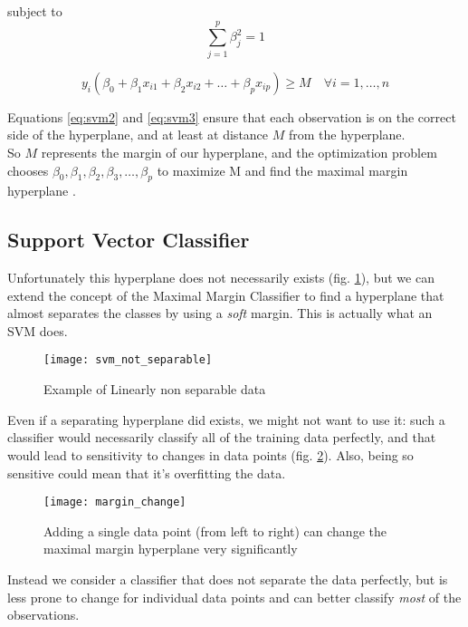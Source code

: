 subject to
\begin{equation} \label{eq:svm2}
	\sum_{j=1}^{p}\beta^2_j = 1
\end{equation}

\begin{equation} \label{eq:svm3}
	y_i(\beta_0 + \beta_1 x_{i1} + \beta_2 x_{i2} + \dots + \beta_p x_{ip}) \ge M \quad \forall i = 1, \dots, n
\end{equation}

Equations \ref{eq:svm2} and \ref{eq:svm3} ensure that each observation is on the correct side of the hyperplane, and at least at distance $M$ from the hyperplane. \\
So $M$ represents the margin of our hyperplane, and the optimization problem chooses $\beta_0, \beta_1, \beta_2, \beta_3, \dots, \beta_p$ to maximize M and find the maximal margin hyperplane \cite{ISLR}.

\subsection{Support Vector Classifier}
Unfortunately this hyperplane does not necessarily exists (fig. \ref{fig:svmnotsep}), but we can extend the concept of the Maximal Margin Classifier to find a hyperplane that almost separates the classes by using a \textit{soft} margin. This is actually what an SVM does.

\begin{figure}[H]
	\centering
	\texttt{[image: svm\_not\_separable]}
	\caption{Example of Linearly non separable data \cite{svm_not_sep}}
	\label{fig:svmnotsep}
\end{figure}

Even if a separating hyperplane did exists, we might not want to use it: such a classifier would necessarily  classify all of the training data perfectly, and that would lead to sensitivity to changes in data points (fig. \ref{fig:margin_change}). Also, being so sensitive could mean that it's overfitting the data. 

\begin{figure}[H]
	\centering
	\texttt{[image: margin\_change]}
	\caption{Adding a single data point (from left to right) can change the maximal margin hyperplane very significantly \cite{ISLR}}
	\label{fig:margin_change}
\end{figure}

Instead we consider a classifier that does not separate the data perfectly, but is less prone to change for individual data points and can better classify \textit{most} of the observations.

